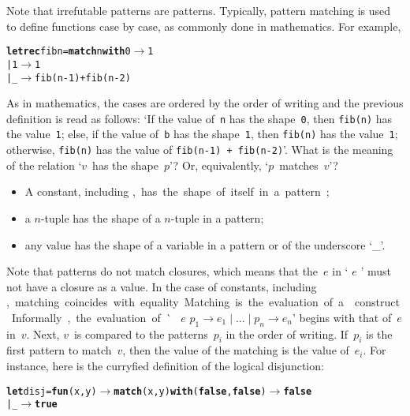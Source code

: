 \noindent Note that irrefutable patterns are patterns. Typically,
pattern matching is used to define functions case by case, as commonly
done in mathematics. For example,
\begin{alltt}
\textbf{let rec} fib n = \textbf{match} n \textbf{with} 0 \(\rightarrow\) 1
                           | 1 \(\rightarrow\) 1
                           | \_ \(\rightarrow\) fib(n-1) + fib(n-2)
\end{alltt}
As in mathematics, the cases are ordered by the order of writing and
the previous definition is read as follows: `If the value
of~\texttt{n} has the shape~\texttt{0}, then \texttt{fib(n)} has the
value~\texttt{1}; else, if the value of~\texttt{b} has the
shape~\texttt{1}, then \texttt{fib(n)} has the value~\texttt{1};
otherwise, \texttt{fib(n)} has the value of \texttt{fib(n-1) +
fib(n-2)}'. What is the meaning of the relation `\(v\)~has the
shape~\(p\)'?  Or, equivalently, `\(p\)~matches~\(v\)'?
\begin{itemize}

  \item A constant, including \unit, has the shape of itself in a
    pattern;

  \item a \(n\)-tuple has the shape of a \(n\)-tuple in a pattern;

  \item any value has the shape of a variable in a pattern or
    of the underscore `{\Large \_}'.

\end{itemize}
Note that patterns do not match closures, which means that the~\(e\)
in `\Xmatch{} $e$ \Xwith{}' must not have a closure as a value. In the
case of constants, including \unit, matching coincides with equality.

Matching is the evaluation of a \Xmatch construct. Informally, the
evaluation of `\Xmatch{} $e$ \Xwith{} $p_1 \rightarrow e_1 \mid
\ldots \mid p_n \rightarrow e_n$' begins with that of~$e$
in~$v$. Next, \(v\)~is compared to the patterns~\(p_i\) in the order
of writing. If~\(p_i\) is the first pattern to match~\(v\), then the
value of the matching is the value of~\(e_i\). For instance, here is
the curryfied definition of the logical disjunction:
\begin{alltt}
\textbf{let} disj = \textbf{fun} (x,y) \(\rightarrow\) \textbf{match} (x,y) \textbf{with} (\textbf{false}, \textbf{false}) \(\rightarrow\) \textbf{false}
                                       | \_ \(\rightarrow\) \textbf{true}
\end{alltt}

